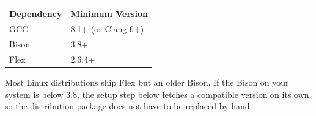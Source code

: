\begin{center}
\centering\small
\begin{tabularx}{\linewidth}{@{}lX@{}}
\toprule
\textbf{Dependency} & \textbf{Minimum Version} \\
\midrule
GCC & 8.1+ (or Clang 6+) \\
Bison & 3.8+ \\
Flex & 2.6.4+ \\
\bottomrule
\end{tabularx}
\end{center}

Most Linux distributions ship Flex but an older Bison. If the Bison on your system is below 3.8, the setup step below fetches a compatible version on its own, so the distribution package does not have to be replaced by hand.
